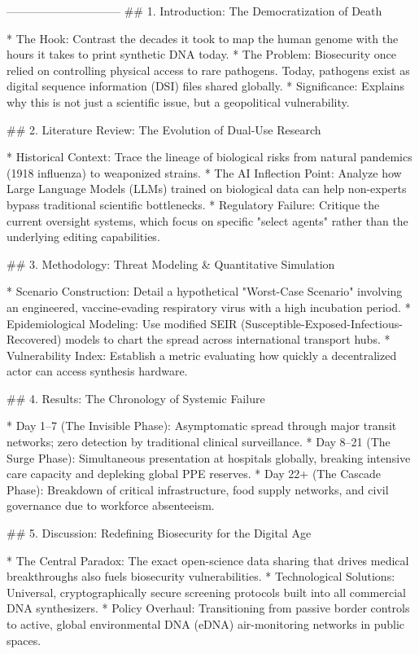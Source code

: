 ------------------------------
## 1. Introduction: The Democratization of Death

* The Hook: Contrast the decades it took to map the human genome with the hours it takes to print synthetic DNA today.
* The Problem: Biosecurity once relied on controlling physical access to rare pathogens. Today, pathogens exist as digital sequence information (DSI) files shared globally.
* Significance: Explains why this is not just a scientific issue, but a geopolitical vulnerability.

## 2. Literature Review: The Evolution of Dual-Use Research

* Historical Context: Trace the lineage of biological risks from natural pandemics (1918 influenza) to weaponized strains.
* The AI Inflection Point: Analyze how Large Language Models (LLMs) trained on biological data can help non-experts bypass traditional scientific bottlenecks.
* Regulatory Failure: Critique the current oversight systems, which focus on specific "select agents" rather than the underlying editing capabilities.

## 3. Methodology: Threat Modeling & Quantitative Simulation

* Scenario Construction: Detail a hypothetical "Worst-Case Scenario" involving an engineered, vaccine-evading respiratory virus with a high incubation period.
* Epidemiological Modeling: Use modified SEIR (Susceptible-Exposed-Infectious-Recovered) models to chart the spread across international transport hubs.
* Vulnerability Index: Establish a metric evaluating how quickly a decentralized actor can access synthesis hardware.

## 4. Results: The Chronology of Systemic Failure

* Day 1–7 (The Invisible Phase): Asymptomatic spread through major transit networks; zero detection by traditional clinical surveillance.
* Day 8–21 (The Surge Phase): Simultaneous presentation at hospitals globally, breaking intensive care capacity and depleking global PPE reserves.
* Day 22+ (The Cascade Phase): Breakdown of critical infrastructure, food supply networks, and civil governance due to workforce absenteeism.

## 5. Discussion: Redefining Biosecurity for the Digital Age

* The Central Paradox: The exact open-science data sharing that drives medical breakthroughs also fuels biosecurity vulnerabilities.
* Technological Solutions: Universal, cryptographically secure screening protocols built into all commercial DNA synthesizers.
* Policy Overhaul: Transitioning from passive border controls to active, global environmental DNA (eDNA) air-monitoring networks in public spaces.

